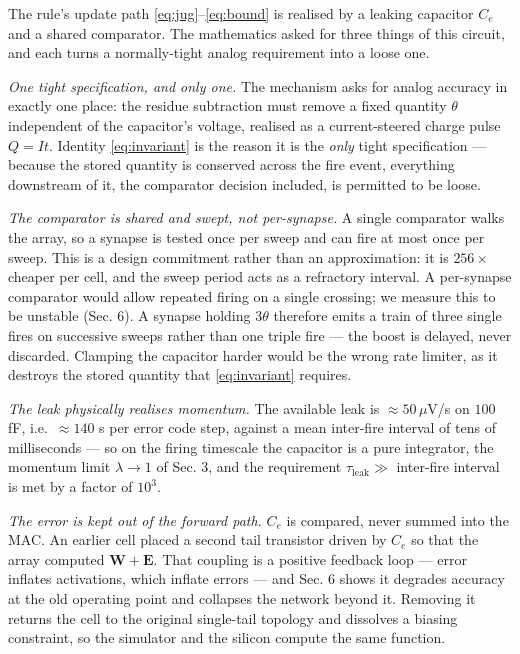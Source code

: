 \documentclass[11pt]{article}
\begin{document}
The rule's update path \eqref{eq:jug}--\eqref{eq:bound} is realised by a leaking capacitor
\(C_e\) and a shared comparator. The mathematics asked for three things
of this circuit, and each turns a normally-tight analog requirement into
a loose one.

\emph{One tight specification, and only one.} The mechanism asks for
analog accuracy in exactly one place: the residue subtraction must
remove a fixed quantity \(\theta\) independent of the capacitor's
voltage, realised as a current-steered charge pulse \(Q = It\). Identity
\eqref{eq:invariant} is the reason it is the \emph{only} tight specification --- because
the stored quantity is conserved across the fire event, everything
downstream of it, the comparator decision included, is permitted to be
loose.

\emph{The comparator is shared and swept, not per-synapse.} A single
comparator walks the array, so a synapse is tested once per sweep and
can fire at most once per sweep. This is a design commitment rather than
an approximation: it is \(256\times\) cheaper per cell, and the sweep
period acts as a refractory interval. A per-synapse comparator would
allow repeated firing on a single crossing; we measure this to be
unstable (Sec. 6). A synapse holding \(3\theta\) therefore emits a train
of three single fires on successive sweeps rather than one triple fire
--- the boost is delayed, never discarded. Clamping the capacitor harder
would be the wrong rate limiter, as it destroys the stored quantity that
\eqref{eq:invariant} requires.

\emph{The leak physically realises momentum.} The available leak is
\(\approx 50\,\mu\)V/s on \(100\) fF, i.e.~\(\approx 140\) s per error
code step, against a mean inter-fire interval of tens of milliseconds
--- so on the firing timescale the capacitor is a pure integrator, the
momentum limit \(\lambda \to 1\) of Sec. 3, and the requirement
\(\tau_{\text{leak}}\gg\) inter-fire interval is met by a factor of
\(10^3\).

\emph{The error is kept out of the forward path.} \(C_e\) is compared,
never summed into the MAC. An earlier cell placed a second tail
transistor driven by \(C_e\) so that the array computed
\(\bm W+ \bm E\). That coupling is a positive feedback loop --- error
inflates activations, which inflate errors --- and Sec. 6 shows it
degrades accuracy at the old operating point and collapses the network
beyond it. Removing it returns the cell to the original single-tail
topology and dissolves a biasing constraint, so the simulator and the
silicon compute the same function.
\end{document}
